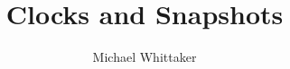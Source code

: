 \documentclass{beamer}
\title{Clocks and Snapshots}
\author{Michael Whittaker}
\begin{document}
\begin{frame}
  \titlepage
\end{frame}


\end{document}
